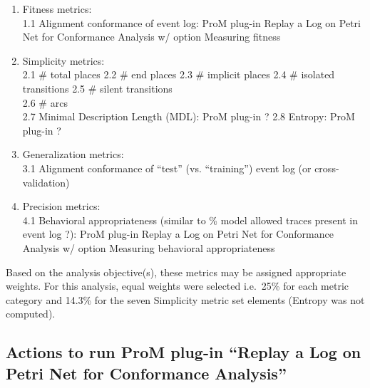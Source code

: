 \documentclass[]{article}
\begin{document}
\begin{enumerate}
\def\labelenumi{\arabic{enumi}.}
\item
  Fitness metrics:\\1.1 Alignment conformance of event log: ProM plug-in
  Replay a Log on Petri Net for Conformance Analysis w/ option Measuring
  fitness
\item
  Simplicity metrics:\\2.1 \# total places 2.2 \# end places 2.3 \#
  implicit places 2.4 \# isolated transitions 2.5 \# silent
  transitions\\2.6 \# arcs\\2.7 Minimal Description Length (MDL): ProM
  plug-in ? 2.8 Entropy: ProM plug-in ?
\item
  Generalization metrics:\\3.1 Alignment conformance of ``test'' (vs.
  ``training'') event log (or cross-validation)
\item
  Precision metrics:\\4.1 Behavioral appropriateness (similar to \%
  model allowed traces present in event log ?): ProM plug-in Replay a
  Log on Petri Net for Conformance Analysis w/ option Measuring
  behavioral appropriateness
\end{enumerate}

Based on the analysis objective(s), these metrics may be assigned
appropriate weights. For this analysis, equal weights were selected
i.e.~25\% for each metric category and 14.3\% for the seven Simplicity
metric set elements (Entropy was not computed).

\subsection{Actions to run ProM plug-in ``Replay a Log on Petri Net for
Conformance
Analysis''}\label{actions-to-run-prom-plug-in-replay-a-log-on-petri-net-for-conformance-analysis}
\end{document}
